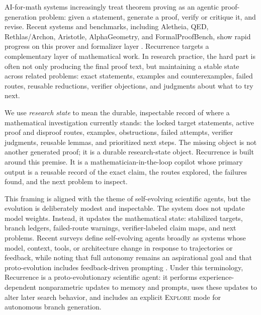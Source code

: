 \documentclass{article}
\theoremstyle{definition}
\theoremstyle{remark}
\begin{document}
AI-for-math systems increasingly treat theorem proving as an agentic proof-generation problem: given a statement, generate a proof, verify or critique it, and revise. Recent systems and benchmarks, including Aletheia, QED, Rethlas/Archon, Aristotle, AlphaGeometry, and FormalProofBench, show rapid progress on this prover and formalizer layer \citep{feng2026towards,an2026qed,ju2026automated,aristotle2025imo,trinh2024alphageometry,ravi2026formalproofbench}. Recurrence targets a complementary layer of mathematical work. In research practice, the hard part is often not only producing the final proof text, but maintaining a stable state across related problems: exact statements, examples and counterexamples, failed routes, reusable reductions, verifier objections, and judgments about what to try next.

We use \emph{research state} to mean the durable, inspectable record of where a mathematical investigation currently stands: the locked target statements, active proof and disproof routes, examples, obstructions, failed attempts, verifier judgments, reusable lemmas, and prioritized next steps. The missing object is not another generated proof; it is a durable research-state object. Recurrence is built around this premise. It is a mathematician-in-the-loop copilot whose primary output is a reusable record of the exact claim, the routes explored, the failures found, and the next problem to inspect.

This framing is aligned with the theme of self-evolving scientific agents, but the evolution is deliberately modest and inspectable. The system does not update model weights. Instead, it updates the mathematical state: stabilized targets, branch ledgers, failed-route warnings, verifier-labeled claim maps, and next problems. Recent surveys define self-evolving agents broadly as systems whose model, context, tools, or architecture change in response to trajectories or feedback, while noting that full autonomy remains an aspirational goal and that proto-evolution includes feedback-driven prompting \citep{gao2026selfevolving}. Under this terminology, Recurrence is a proto-evolutionary scientific agent: it performs experience-dependent nonparametric updates to memory and prompts, uses these updates to alter later search behavior, and includes an explicit \textsc{Explore} mode for autonomous branch generation.
\end{document}
